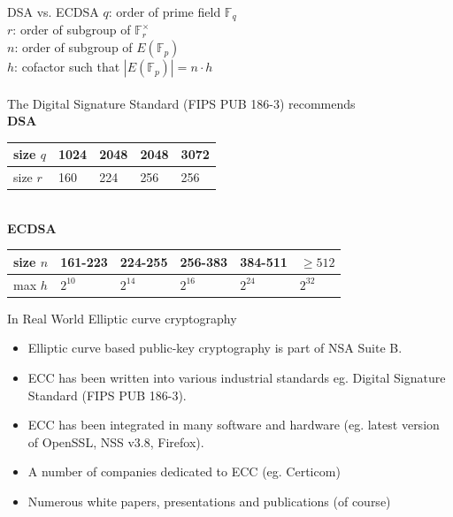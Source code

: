 \documentclass{beamer}
\begin{document}
\begin{frame}{DSA vs. ECDSA}
$q$: order of prime field $\mathbb{F}_q$\\
$r$: order of subgroup of $\mathbb{F}_r^{\times}$\\
$n$: order of subgroup of $E(\mathbb{F}_p)$\\
$h$: cofactor such that $|E(\mathbb{F}_p)| = n\cdot h$\\

~\\[.2in]

The Digital Signature Standard (FIPS PUB 186-3) recommends\\
{\bf DSA}\\
\begin{tabular}{|p{.7in}|p{.7in}|p{.7in}|p{.7in}|p{.7in}|}
\hline
size $q$ & 1024 & 2048 & 2048 & 3072 \\\hline
size $r$ & 160 & 224 & 256 & 256\\
\hline
\end{tabular}
~\\[.1in]

{\bf ECDSA}\\
\begin{tabular}{|p{.4in}|p{.6in}|p{.6in}|p{.6in}|p{.6in}|p{.6in}|}
\hline
size $n$ & 161-223 & 224-255 & 256-383 & 384-511 & $\ge 512$\\\hline
max $h$ & $2^{10}$ & $2^{14}$ & $2^{16}$ & $2^{24}$ & $2^{32}$\\
\hline
\end{tabular}
\end{frame}

\begin{frame}{In Real World}
Elliptic curve cryptography
\begin{itemize}
\item Elliptic curve based public-key cryptography is part of NSA Suite B.
\item ECC has been written into various industrial standards
eg. Digital Signature Standard (FIPS PUB 186-3).
\item ECC has been integrated in many software and hardware (eg. latest version
of OpenSSL, NSS v3.8, Firefox).
\item A number of companies dedicated to ECC (eg. Certicom)
\item Numerous white papers, presentations and publications (of course)
\end{itemize}
\end{frame}
\end{document}
